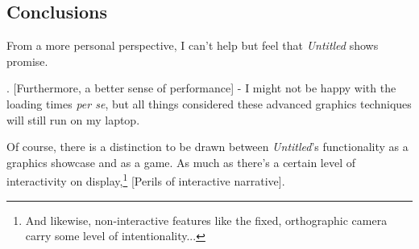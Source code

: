 \documentclass[a4paper, 11pt]{article}
\begin{document}
\begin{flushleft}

\vspace{5pt}

\section{Conclusions}

From a more personal perspective, I can't help but feel that \textit{Untitled} shows promise.

\vspace{5pt}. [Furthermore, a better sense of performance] - I might not be happy with the loading times \textit{per se}, but all things considered these advanced graphics techniques will still run on my laptop.

\vspace{5pt}\noindent
Of course, there is a distinction to be drawn between \textit{Untitled}'s functionality as a graphics showcase and as a game. As much as there's a certain level of interactivity on display,\footnote{And likewise, non-interactive features like the fixed, orthographic camera carry some level of intentionality...} [Perils of interactive narrative].

\vspace{5pt}



\end{flushleft}
\end{document}
